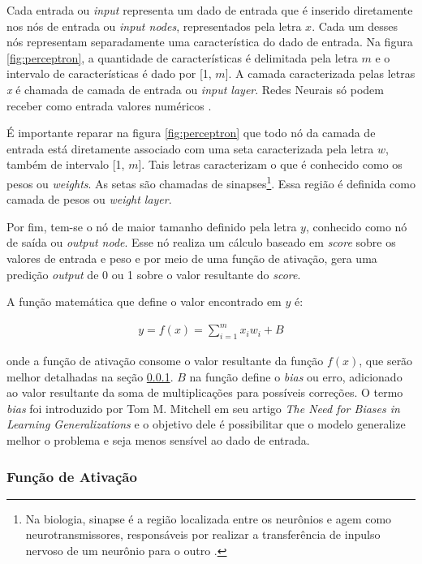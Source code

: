 Cada entrada ou \textit{input} representa um dado de entrada que é inserido diretamente nos nós de entrada ou \textit{input nodes}, representados pela letra \(x\). Cada um desses nós representam separadamente uma característica do dado de entrada. Na figura \ref{fig:perceptron}, a quantidade de características é delimitada pela letra \(m\) e o intervalo de características é dado por [1, \(m\)]. A camada caracterizada pelas letras \textit{x} é chamada de camada de entrada ou \textit{input layer}. Redes Neurais só podem receber como entrada valores numéricos \cite{deep-learning-book-br}.

É importante reparar na figura \ref{fig:perceptron} que todo nó da camada de entrada está diretamente associado com uma seta caracterizada pela letra \(w\), também de intervalo [1, \(m\)]. Tais letras caracterizam o que é conhecido como os pesos ou \textit{weights}. As setas são chamadas de sinapses\footnote
{
  Na biologia, sinapse é a região localizada entre os neurônios e agem como neurotransmissores, responsáveis por realizar a transferência de inpulso nervoso de um neurônio para o outro \cite{synapses}.
}.
Essa região é definida como camada de pesos ou \textit{weight layer}.

Por fim, tem-se o nó de maior tamanho definido pela letra \(y\), conhecido como nó de saída ou \textit{output node}. Esse nó realiza um cálculo baseado em \textit{score} sobre os valores de entrada e peso e por meio de uma função de ativação, gera uma predição \textit{output} de 0 ou 1 sobre o valor resultante do \textit{score}.

A função matemática que define o valor encontrado em \(y\) é:

\begin{gather}
  y = f(x) = \sum_{i=1}^{m} x_iw_i + B
  \label{math:perceptron-math}
\end{gather}

onde a função de ativação consome o valor resultante da função \(f(x)\), que serão melhor detalhadas na seção \ref{sssec:activation-func}. \(B\) na função define o \textit{bias} ou erro, adicionado ao valor resultante da soma de multiplicações para possíveis correções. O termo \textit{bias} foi introduzido por Tom M. Mitchell em seu artigo \textit{The Need for Biases in Learning Generalizations} \cite{biases} e o objetivo dele é possibilitar que o modelo generalize melhor o problema e seja menos sensível ao dado de entrada.

\subsubsection{Função de Ativação} \label{sssec:activation-func}

